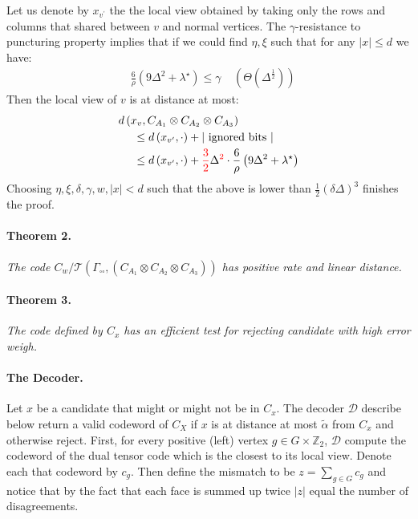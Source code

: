 \documentclass{article}
\begin{document}
\begin{multicols*}{2}
 Let us denote by $x_{v^{\prime}}$ the the local view obtained by taking only the rows and columns that shared between $v$ and normal vertices. The $\gamma$-resistance to puncturing property implies that if we could find $ \eta, \xi  $ such that for any $ |x| \le d $ we have:
 \begin{equation*}
   \begin{split}
     &  \frac{6}{\rho} \left( 9\Delta^{2} + \lambda^{\star}  \right) \le \gamma \ \ \ \ \ \left( \Theta\left(  \Delta^{\frac{1}{2}} \right) \right)
   \end{split}
 \end{equation*}
 Then the local view of $v$ is at distance at most:
 \begin{equation*}
   \begin{split}
     & d\left(x_{v}, C_{A_{1}} \otimes C_{A_{2}} \otimes C_{A_{3}}\right) \\ 
     & \ \ \ \ \le d\left(x_{v^{\prime} }, \cdot \right) + |\text{ ignored bits }|\\
     & \ \ \ \ \le  d\left(x_{v^{\prime}}, \cdot \right) +  \color{red}\frac{3}{2} \color{black} \Delta^{\color{red} 2 \color{black} } \cdot \frac{6}{\rho} \left( 9\Delta^{2} + \lambda^{\star}  \right) 
   \end{split}
 \end{equation*}
 Choosing $ \eta, \xi, \delta, \gamma, w, |x| < d $ such that the above is lower than $\frac{1}{2}\left( \delta\Delta \right)^{3}$ finishes the proof. 
 \paragraph{Theorem 2.} \textit{ The code $C_{w} / \mathcal{T}\left( \Gamma_{\square \square}, \left(  C_{A_1} \otimes C_{A_2} \otimes C_{A_3} \right)  \right)  $ has positive rate and linear distance.}
 \paragraph{Theorem 3.} \textit{ The code defined by $C_{x}$ has an efficient test for rejecting candidate with high error weigh. } 
 \paragraph{The Decoder.} Let $x$ be a candidate that might or might not be in $C_{x}$. The decoder $\mathcal{D}$ describe below return a valid codeword of $C_{X}$ if $x$ is at distance at most $\tilde{\alpha}$ from $C_{x}$ and otherwise reject.
 First, for every positive (left) vertex $g\in G\times \mathbb{Z}_2 $,  $\mathcal{D}$ compute the codeword of the dual tensor code which is the closest to its local view. Denote each that codeword by $c_g$. 
 Then define the mismatch to be $z = \sum_{g \in G}{c_g} $ and notice that by the fact that each face is summed up twice $|z|$ equal the number of disagreements. 
 

\end{multicols*}
\end{document}
